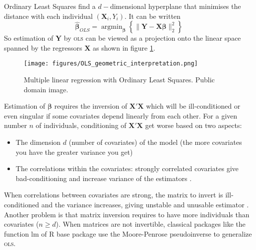 \documentclass[12pt,a4paper]{report}
\begin{document}
	Ordinary Least Squares find a $d-$dimensional hyperplane that minimises the distance with each individual $(\boldsymbol{X}_i,Y_i)$. It can be written
	\begin{equation}
		\boldsymbol{\hat{\beta}}_{OLS}=\operatorname{argmin}_{\boldsymbol{\beta}}\left\lbrace \parallel \boldsymbol{Y}-\boldsymbol{X\beta}\parallel_2^2 \right\rbrace  \nonumber 
	\end{equation}
	So estimation of $\boldsymbol{Y}$ by \textsc{ols} can be viewed as a projection onto the linear space spanned by the regressors $\boldsymbol{X}$ as shown in figure \ref{geomOLS}.%
	\begin{figure}[h!]
	\centering
	\texttt{[image: figures/OLS\_geometric\_interpretation.png]}
	\caption{Multiple linear regression with Ordinary Least Squares. Public domain image.} \label{geomOLS}
	\end{figure}
	
	Estimation of $\boldsymbol{\beta}$ requires the inversion of $\boldsymbol{X}'\boldsymbol{X}$ which will be ill-conditioned or even singular if some covariates depend linearly from each other. 
For a given number $n$ of individuals, conditioning of $\boldsymbol{X}'\boldsymbol{X}$ get worse based on two aspects: 
\begin{itemize}
	\item The dimension $d$ (number of covariates) of the model (the more covariates you have the greater variance you get)
	\item The correlations within the covariates: strongly correlated covariates give bad-conditioning and increase variance of the estimators .
\end{itemize}
	When correlations between covariates are strong, the matrix to invert is ill-conditioned and the variance increases, giving unstable and unusable estimator \cite{hoerl1970ridge}.
	Another problem is that matrix inversion requires to have more individuals than covariates ($n\geq d$).
	When matrices are not invertible, classical packages like the function lm of R base package \cite{packagebase} use the Moore-Penrose pseudoinverse \cite{PSP:2043984} to generalize \textsc{ols}.	\\	
		
\end{document}
